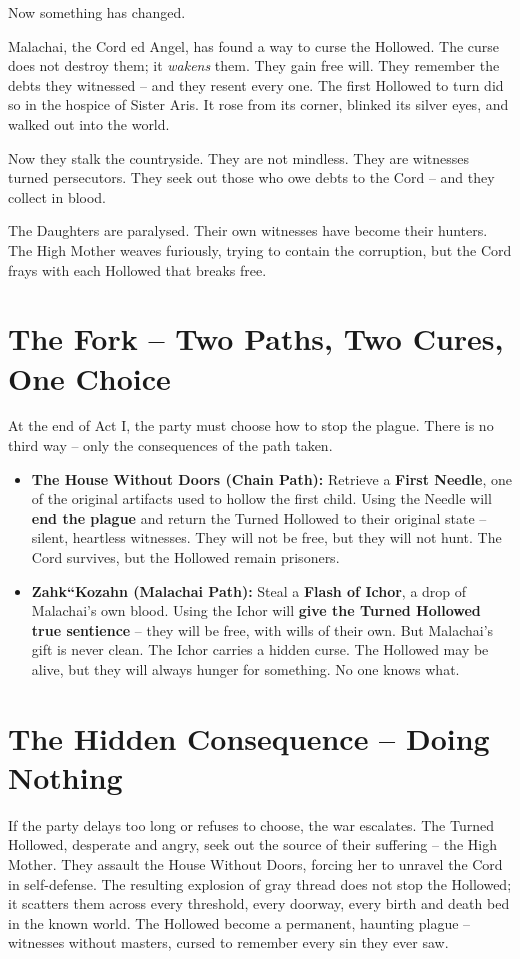 \documentclass[10pt,twoside]{book}
\begin{document}
Now something has changed.

Malachai, the Cord ed Angel, has found a way to curse the Hollowed. The curse does not destroy them; it \textit{wakens} them. They gain free will. They remember the debts they witnessed -- and they resent every one. The first Hollowed to turn did so in the hospice of Sister Aris. It rose from its corner, blinked its silver eyes, and walked out into the world.

Now they stalk the countryside. They are not mindless. They are witnesses turned persecutors. They seek out those who owe debts to the Cord -- and they collect in blood.

The Daughters are paralysed. Their own witnesses have become their hunters. The High Mother weaves furiously, trying to contain the corruption, but the Cord frays with each Hollowed that breaks free.

\section{The Fork -- Two Paths, Two Cures, One Choice}
At the end of Act I, the party must choose how to stop the plague. There is no third way -- only the consequences of the path taken.

\begin{itemize}
\item \textbf{The House Without Doors (Chain Path):} Retrieve a \textbf{First Needle}, one of the original artifacts used to hollow the first child. Using the Needle will \textbf{end the plague} and return the Turned Hollowed to their original state -- silent, heartless witnesses. They will not be free, but they will not hunt. The Cord survives, but the Hollowed remain prisoners.
\item \textbf{Zahk``Kozahn (Malachai Path):} Steal a \textbf{Flash of Ichor}, a drop of Malachai's own blood. Using the Ichor will \textbf{give the Turned Hollowed true sentience} -- they will be free, with wills of their own. But Malachai's gift is never clean. The Ichor carries a hidden curse. The Hollowed may be alive, but they will always hunger for something. No one knows what.
\end{itemize}

\section{The Hidden Consequence -- Doing Nothing}
If the party delays too long or refuses to choose, the war escalates. The Turned Hollowed, desperate and angry, seek out the source of their suffering -- the High Mother. They assault the House Without Doors, forcing her to unravel the Cord in self-defense. The resulting explosion of gray thread does not stop the Hollowed; it scatters them across every threshold, every doorway, every birth and death bed in the known world. The Hollowed become a permanent, haunting plague -- witnesses without masters, cursed to remember every sin they ever saw.
\end{document}
